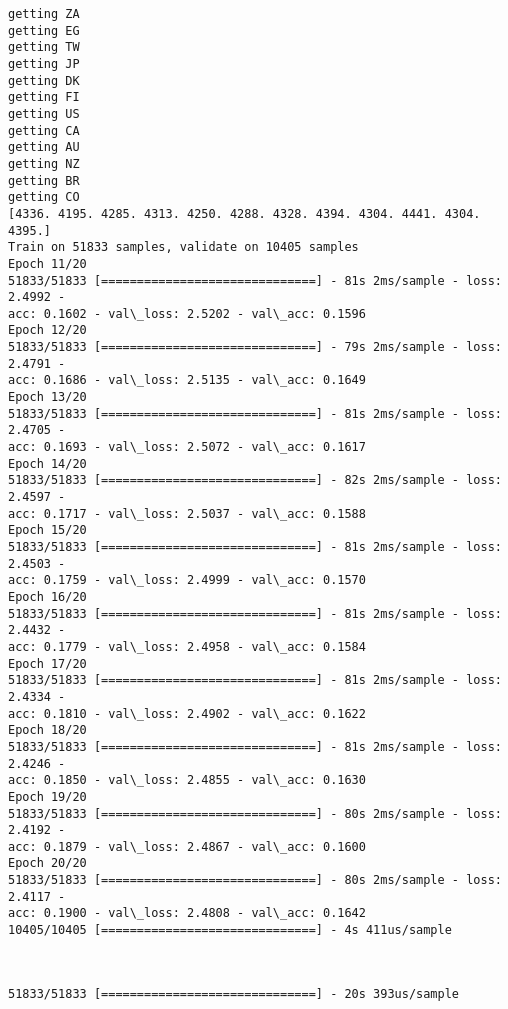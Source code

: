 \documentclass[11pt]{article}
\begin{document}
    \begin{Verbatim}[commandchars=\\\{\}]
getting ZA
getting EG
getting TW
getting JP
getting DK
getting FI
getting US
getting CA
getting AU
getting NZ
getting BR
getting CO
[4336. 4195. 4285. 4313. 4250. 4288. 4328. 4394. 4304. 4441. 4304. 4395.]
Train on 51833 samples, validate on 10405 samples
Epoch 11/20
51833/51833 [==============================] - 81s 2ms/sample - loss: 2.4992 -
acc: 0.1602 - val\_loss: 2.5202 - val\_acc: 0.1596
Epoch 12/20
51833/51833 [==============================] - 79s 2ms/sample - loss: 2.4791 -
acc: 0.1686 - val\_loss: 2.5135 - val\_acc: 0.1649
Epoch 13/20
51833/51833 [==============================] - 81s 2ms/sample - loss: 2.4705 -
acc: 0.1693 - val\_loss: 2.5072 - val\_acc: 0.1617
Epoch 14/20
51833/51833 [==============================] - 82s 2ms/sample - loss: 2.4597 -
acc: 0.1717 - val\_loss: 2.5037 - val\_acc: 0.1588
Epoch 15/20
51833/51833 [==============================] - 81s 2ms/sample - loss: 2.4503 -
acc: 0.1759 - val\_loss: 2.4999 - val\_acc: 0.1570
Epoch 16/20
51833/51833 [==============================] - 81s 2ms/sample - loss: 2.4432 -
acc: 0.1779 - val\_loss: 2.4958 - val\_acc: 0.1584
Epoch 17/20
51833/51833 [==============================] - 81s 2ms/sample - loss: 2.4334 -
acc: 0.1810 - val\_loss: 2.4902 - val\_acc: 0.1622
Epoch 18/20
51833/51833 [==============================] - 81s 2ms/sample - loss: 2.4246 -
acc: 0.1850 - val\_loss: 2.4855 - val\_acc: 0.1630
Epoch 19/20
51833/51833 [==============================] - 80s 2ms/sample - loss: 2.4192 -
acc: 0.1879 - val\_loss: 2.4867 - val\_acc: 0.1600
Epoch 20/20
51833/51833 [==============================] - 80s 2ms/sample - loss: 2.4117 -
acc: 0.1900 - val\_loss: 2.4808 - val\_acc: 0.1642
10405/10405 [==============================] - 4s 411us/sample
    \end{Verbatim}

    \begin{center}
    \end{center}
    { \hspace*{\fill} \\}
    
    \begin{Verbatim}[commandchars=\\\{\}]
51833/51833 [==============================] - 20s 393us/sample
    \end{Verbatim}

    \begin{center}
    \end{center}
    { \hspace*{\fill} \\}
    
\end{document}
